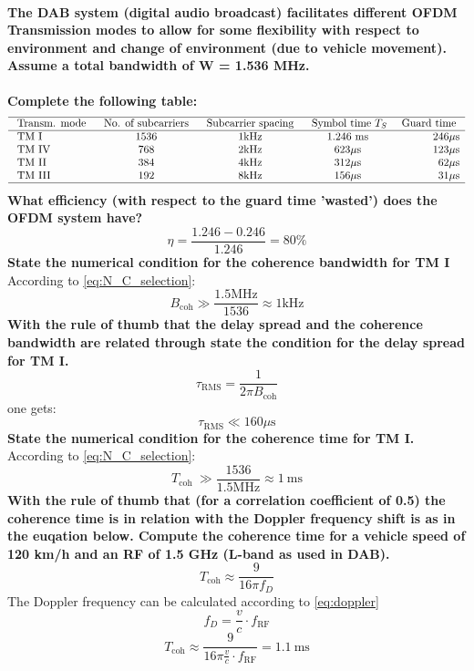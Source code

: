 \paragraph{The DAB system (digital audio broadcast) facilitates different OFDM Transmission modes to allow for some
flexibility with respect to environment and change of environment (due to vehicle movement). Assume a total
bandwidth of W = 1.536 MHz.}
\textbf{Complete the following table:}
$$
\begin{array}{lcccr}
\hline \text { Transm. mode } & \text { No. of subcarriers } & \text { Subcarrier spacing } & \text { Symbol time }{ } T_S & \text { Guard time } \\
\hline \text { TM I } & 1536 & 1 \mathrm{kHz} & 1.246 \mathrm{~ms} & 246 \mu \mathrm{s} \\
\text { TM IV } & 768 & 2 \mathrm{kHz} & 623 \mu \mathrm{s} & 123 \mu \mathrm{s} \\
\text { TM II } & 384 & 4 \mathrm{kHz} & 312 \mu \mathrm{s} & 62 \mu \mathrm{s} \\
\text { TM III } & 192 & 8 \mathrm{kHz} & 156 \mu \mathrm{s} & 31 \mu \mathrm{s} \\
\hline
\end{array}
$$
\textbf{What efficiency (with respect to the guard time 'wasted') does the OFDM system have?}
$$
\eta=\frac{1.246-0.246}{1.246}=80 \%
$$
\textbf{State the numerical condition for the coherence bandwidth for TM I}
According to \autoref{eq:N_C_selection}:
$$
B_{\mathrm{coh}} \gg \frac{1.5 \mathrm{MHz}}{1536} \approx 1 \mathrm{kHz}
$$
\textbf{With the rule of thumb that the delay spread and the coherence bandwidth are related through state the condition for the delay spread for TM I.}
$$
\tau_{\mathrm{RMS}}=\frac{1}{2 \pi B_{\mathrm{coh}}}
$$
one gets:
$$
\tau_{\mathrm{RMS}} \ll 160 \mu \mathrm{s}
$$
\textbf{State the numerical condition for the coherence time for TM I.}
According to \autoref{eq:N_C_selection}:
$$
T_{\text {coh }} \gg \frac{1536}{1.5 \mathrm{MHz}} \approx 1 \mathrm{~ms}
$$
\textbf{With the rule of thumb that (for a correlation coefficient of 0.5) the coherence time is in relation with the Doppler frequency shift is as in the euqation below. Compute the coherence time for a vehicle speed of 120 km/h and an RF of 1.5 GHz (L-band as used in DAB).}
$$
T_{\mathrm{coh}} \approx \frac{9}{16 \pi f_D}
$$
The Doppler frequency can be calculated according to \autoref{eq:doppler}
\begin{equation}\label{eq:doppler}
f_D=\frac{v}{c} \cdot f_{\mathrm{RF}}
\end{equation}
$$
T_{\mathrm{coh}} \approx \frac{9}{16 \pi \frac{v}{c} \cdot f_{\mathrm{RF}}}=1.1 \mathrm{~ms}
$$
